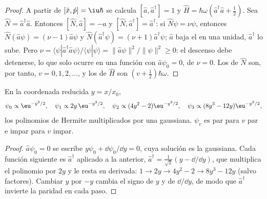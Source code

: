 \begin{proof}
A partir de $[\hat x,\hat p] = \iu\hbar$ se calcula $[\hat a,\hat a^\dagger] = 1$ y
$\hat H = \hbar\omega(\hat a^\dagger\hat a + \frac12)$. Sea $\hat N =
\hat a^\dagger\hat a$. Entonces $[\hat N,\hat a] = -\hat a$ y $[\hat N,\hat
a^\dagger] = \hat a^\dagger$: si $\hat N\psi = \nu\psi$, entonces $\hat N(\hat
a\psi) = (\nu - 1)\hat a\psi$ y $\hat N(\hat a^\dagger\psi) = (\nu + 1)\hat
a^\dagger\psi$; $\hat a$ baja el  en una unidad, $\hat a^\dagger$ lo
sube. Pero $\nu = \langle\psi|\hat a^\dagger\hat a\psi\rangle/\langle\psi|\psi
\rangle = \|\hat a\psi\|^2/\|\psi\|^2 \ge 0$: el descenso debe detenerse, lo que
solo ocurre en una función con $\hat a\psi_0 = 0$, de  $\nu = 0$.
Los  de $\hat N$ son, por tanto, $v = 0, 1, 2, \dots$, y los de
$\hat H$ son $(v + \frac12)\hbar\omega$.
\end{proof}

\begin{proposition}\label{prop:b3:quantum-model-systems:oscillator-functions}
En la coordenada reducida $y = x/x_0$,
\[
\psi_0 \propto \eu^{-y^2/2}, \quad \psi_1 \propto 2y\,\eu^{-y^2/2}, \quad
\psi_2 \propto (4y^2 - 2)\eu^{-y^2/2}, \quad \psi_3 \propto (8y^3 -
12y)\eu^{-y^2/2},
\]
los polinomios de Hermite multiplicados por una gaussiana. $\psi_v$ es par para $v$ par
e impar para $v$ impar.
\end{proposition}

\begin{proof}
$\hat a\psi_0 = 0$ se escribe $y\psi_0 + \dd\psi_0/\dd y = 0$, cuya solución es la
gaussiana. Cada función siguiente es $\hat a^\dagger$ aplicado a la anterior,
$\hat a^\dagger = \frac{1}{\sqrt2}(y - \dd/\dd y)$, que multiplica el
polinomio por $2y$ y le resta su derivada: $1 \to 2y \to 4y^2 - 2 \to
8y^3 - 12y$ (salvo factores). Cambiar $y$ por $-y$ cambia el signo de $y$
y de $\dd/\dd y$, de modo que $\hat a^\dagger$ invierte la paridad en cada paso.
\end{proof}

